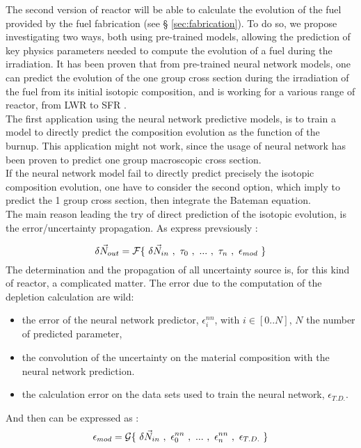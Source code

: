 \documentclass[dvips,12pt]{article}
\begin{document}

The second version of reactor will be able to
calculate the evolution of the fuel provided by
the fuel fabrication (see \S
\ref{sec:fabrication}).  To do so, we propose
investigating two ways, both using pre-trained
models, allowing the prediction of key physics
parameters needed to compute the evolution of a
fuel during the irradiation. It has been proven
that from pre-trained neural network models, one
can predict the evolution of the one group cross
section during the irradiation of the fuel from
its initial isotopic composition, and is working
for a various range of reactor, from LWR to SFR
\cite{Leniau Neural networks,
  Leniau.PHYSOR.2016}.\\ 
The first application using the neural network
predictive models, is to train a model to directly
predict the composition evolution as the function
of the burnup. This application might not work,
since the usage of neural network has been proven
to predict one group macroscopic cross
section.\\ 
If the neural network model fail to directly
predict precisely the isotopic composition
evolution, one have to consider the second option,
which imply to predict the 1 group cross section,
then integrate the Bateman equation.\\

The main reason leading the try of direct
prediction of the isotopic evolution, is the
error/uncertainty propagation. As express
prevsiously :

\begin{equation}
\delta \vec{N}_{out} = {\cal F}\{~\delta\vec{N}_{in}~,~\tau_0~,~...~,~\tau_n~,~\epsilon_{mod}~\}
\end{equation}
The determination and the propagation of all
uncertainty source is, for this kind of reactor, a
complicated matter. The error due to the
computation of the depletion calculation are wild:
\begin{itemize}
\item the error of the neural network predictor,
  $\epsilon^{nn}_{i}$, with $i\in[0..N]$, $N$ the
  number of predicted parameter,
\item the convolution of the uncertainty on the
  material composition with the neural network
  prediction.
\item the calculation error on the data sets used
  to train the neural network, $\epsilon_{T.D.}$.
\end{itemize}
And then can be expressed as :
\begin{equation}
\epsilon_{mod} = {\cal G}\{~\delta\vec{N}_{in}~,~\epsilon^{nn}_{0}~,~...~,~\epsilon^{nn}_{n}~,~\epsilon_{T.D.}~\}
\end{equation}
\end{document}
